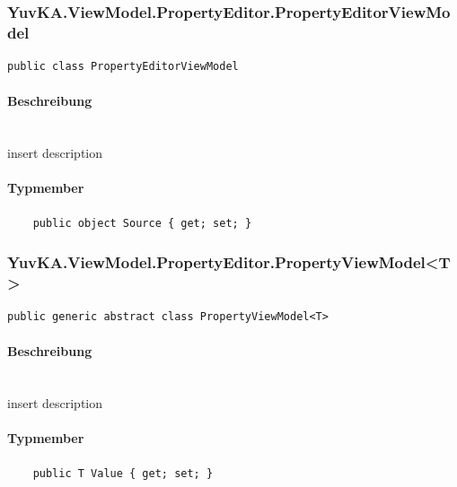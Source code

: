 \subsubsection{YuvKA.ViewModel.PropertyEditor.PropertyEditorViewModel}

\begin{verbatim}
public class PropertyEditorViewModel
\end{verbatim}

\paragraph{Beschreibung}~\\
insert description

\paragraph{Typmember}
\begin{itemize}

	\begin{verbatim}
	public object Source { get; set; }
	\end{verbatim}

\end{itemize}




\subsubsection{YuvKA.ViewModel.PropertyEditor.PropertyViewModel<T>}

\begin{verbatim}
public generic abstract class PropertyViewModel<T>
\end{verbatim}

\paragraph{Beschreibung}~\\
insert description

\paragraph{Typmember}
\begin{itemize}

	\begin{verbatim}
	public T Value { get; set; }
	\end{verbatim}

\end{itemize}





